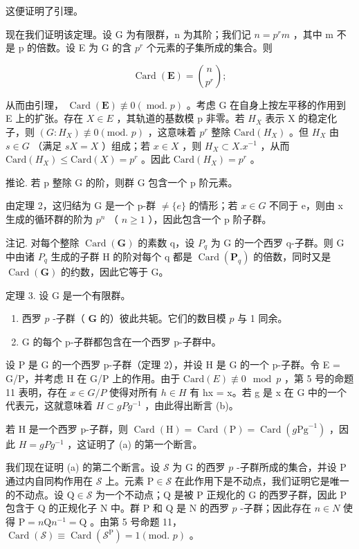 这便证明了引理。

现在我们证明该定理。设 G 为有限群，n 为其阶；我们记 \(n = p^{r}m\) ，其中 m 不是 p 的倍数。设 E 为 G 的含 \(p^{r}\) 个元素的子集所成的集合。则

\[
\operatorname{Card} (\mathbf {E}) = \binom{n}{p ^ {r}};
\]

从而由引理， \(\operatorname{Card}(\mathbf{E}) \not\equiv 0 (\operatorname{mod.} p)\) 。考虑 G 在自身上按左平移的作用到 E 上的扩张。存在 \(X \in E\) ，其轨道的基数模 p 非零。若 \(H_{X}\) 表示 X 的稳定化子，则 \((G:H_{X}) \not\equiv 0 (\text{mod. } p)\) ，这意味着 \(p^{r}\) 整除 \(\text{Card}(H_{X})\) 。但 \(H_{X}\) 由 \(s \in G\) （满足 \(sX = X\) ）组成；若 \(x \in X\) ，则 \(H_{X} \subset X.x^{-1}\) ，从而 \(\text{Card}(H_{X}) \leqslant \text{Card}(X) = p^{r}\) 。因此 \(\text{Card}(H_{X}) = p^{r}\) 。

推论. 若 p 整除 G 的阶，则群 G 包含一个 p 阶元素。

由定理 2，这归结为 G 是一个 p-群 \(\neq\{e\}\) 的情形；若 \(x\in G\) 不同于 e，则由 x 生成的循环群的阶为 \(p^{n}\) （ \(n\geqslant1\) ），因此包含一个 p 阶子群。

注记. 对每个整除 \(\operatorname{Card}(\mathbf{G})\) 的素数 q，设 \(P_{q}\) 为 G 的一个西罗 q-子群。则 G 中由诸 \(P_{q}\) 生成的子群 H 的阶对每个 q 都是 \(\operatorname{Card}(\mathbf{P}_{q})\) 的倍数，同时又是 \(\operatorname{Card}(\mathbf{G})\) 的约数，因此它等于 G。

定理 3. 设 G 是一个有限群。

\begin{enumerate}
\def\labelenumi{(\alph{enumi})}
\item
  西罗 \(p\) -子群（ \(\mathbf{G}\) 的）彼此共轭。它们的数目模 \(p\) 与 1 同余。
\item
  G 的每个 p-子群都包含在一个西罗 p-子群中。
\end{enumerate}

设 P 是 G 的一个西罗 p-子群（定理 2），并设 H 是 G 的一个 p-子群。令 E = G/P，并考虑 H 在 G/P 上的作用。由于 \(\text{Card}(E) \not\equiv 0 \mod p\) ，第 5 号的命题 11 表明，存在 \(x \in G/P\) 使得对所有 \(h \in H\) 有 hx = x。若 g 是 x 在 G 中的一个代表元，这就意味着 \(H \subset gPg^{-1}\) ，由此得出断言 (b)。

若 H 是一个西罗 p-子群，则 \(\operatorname{Card}(\mathrm{H}) = \operatorname{Card}(\mathrm{P}) = \operatorname{Card}(g\mathrm{Pg}^{-1})\) ，因此 \(H = gPg^{-1}\) ，这证明了 (a) 的第一个断言。

我们现在证明 (a) 的第二个断言。设 \(\mathcal{S}\) 为 G 的西罗 \(p\) -子群所成的集合，并设 P 通过内自同构作用在 \(\mathcal{S}\) 上。元素 \(\mathrm{P} \in \mathcal{S}\) 在此作用下是不动点，我们证明它是唯一的不动点。设 \(\mathrm{Q} \in \mathcal{S}\) 为一个不动点；Q 是被 P 正规化的 G 的西罗子群，因此 P 包含于 Q 的正规化子 N 中。群 P 和 Q 是 N 的西罗 \(p\) -子群；因此存在 \(n \in N\) 使得 \(\mathrm{P} = n\mathrm{Q}n^{-1} = \mathrm{Q}\) 。由第 5 号命题 11， \(\operatorname{Card}(\mathcal{S}) \equiv \operatorname{Card}(\mathcal{S}^{\mathrm{P}}) = 1 (\text{mod. } p)\) 。

